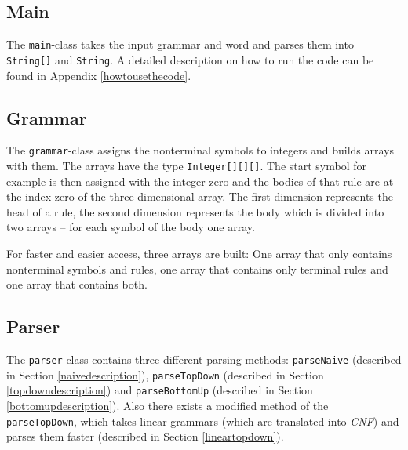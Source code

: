 \documentclass[a4paper, 11pt]{article}
\begin{document}



\subsection{Main}
\label{main}

The \texttt{main}-class takes the input grammar and word and parses them into \texttt{String[]} and \texttt{String}. 
A detailed description on how to run the code can be found in Appendix \ref{howtousethecode}.



\subsection{Grammar}
\label{grammar}


The \texttt{grammar}-class assigns the nonterminal symbols to integers and builds arrays with them. The arrays have the type \texttt{Integer[][][]}. The start symbol for example is then assigned with the integer zero and the bodies of that rule are at the index zero of the three-dimensional array. The first dimension represents the head of a rule, the second dimension represents the body which is divided into two arrays -- for each symbol of the body one array.


For faster and easier access, three arrays are built: One array that only contains nonterminal symbols and rules, one array that contains only terminal rules and one array that contains both.









\subsection{Parser}
\label{parser}

The \texttt{parser}-class contains three different parsing methods: \texttt{parseNaive} (described in Section \ref{naivedescription}), \texttt{parseTopDown} (described in Section \ref{topdowndescription}) and \texttt{parseBottomUp} (described in Section \ref{bottomupdescription}). Also there exists a modified method of the \texttt{parseTopDown}, which takes linear grammars (which are translated into \textit{CNF}) and parses them faster (described in Section \ref{lineartopdown}).
\end{document}
